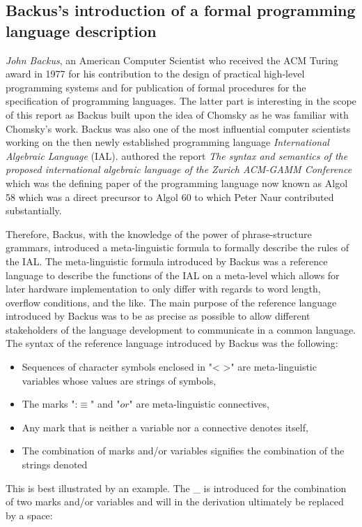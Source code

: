 \documentclass{article}
\begin{document}
\subsection{Backus's introduction of a formal programming language description}
\textit{John Backus}, an American Computer Scientist who received the ACM Turing award in 1977 for his contribution to the design of practical high-level programming systems and for publication of formal procedures for the specification of programming languages. The latter part is interesting in the scope of this report as Backus built upon the idea of Chomsky as he was familiar with Chomsky's work. Backus was also one of the most influential computer scientists working on the then newly established programming language \textit{International Algebraic Language} (IAL). \citet{Backus1959TheSA} authored the report \textit{The syntax and semantics of the proposed international algebraic language of the Zurich ACM-GAMM Conference} which was the defining paper of the programming language now known as Algol 58 which was a direct precursor to Algol 60 to which Peter Naur contributed substantially.

Therefore, Backus, with the knowledge of the power of phrase-structure grammars, introduced a meta-linguistic formula to formally describe the rules of the IAL. The meta-linguistic formula introduced by Backus was a reference language to describe the functions of the IAL on a meta-level which allows for later hardware implementation to only differ with regards to word length, overflow conditions, and the like. The main purpose of the reference language introduced by Backus was to be as precise as possible to allow different stakeholders of the language development to communicate in a common language.
\\
The syntax of the reference language introduced by Backus was the following:
\begin{itemize}
	\item Sequences of character symbols enclosed in "< >" are meta-linguistic variables whose values are strings of symbols,
	\item The marks ":$\equiv$" and "$or$" are meta-linguistic connectives,
	\item Any mark that is neither a variable nor a connective denotes itself,
	\item The combination of marks and/or variables signifies the combination of the strings denoted
\end{itemize} 

This is best illustrated by an example. The \_ is introduced for the combination of two marks and/or variables and will in the derivation ultimately be replaced by a space:
\end{document}
